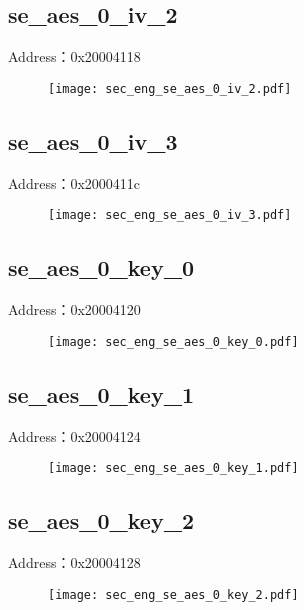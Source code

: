 \subsection{se\_aes\_0\_iv\_2}
\label{sec_eng-se-aes-0-iv-2}
Address：0x20004118
 \begin{figure}[H]
\texttt{[image: sec\_eng\_se\_aes\_0\_iv\_2.pdf]}
\end{figure}

\subsection{se\_aes\_0\_iv\_3}
\label{sec_eng-se-aes-0-iv-3}
Address：0x2000411c
 \begin{figure}[H]
\texttt{[image: sec\_eng\_se\_aes\_0\_iv\_3.pdf]}
\end{figure}

\subsection{se\_aes\_0\_key\_0}
\label{sec_eng-se-aes-0-key-0}
Address：0x20004120
 \begin{figure}[H]
\texttt{[image: sec\_eng\_se\_aes\_0\_key\_0.pdf]}
\end{figure}

\subsection{se\_aes\_0\_key\_1}
\label{sec_eng-se-aes-0-key-1}
Address：0x20004124
 \begin{figure}[H]
\texttt{[image: sec\_eng\_se\_aes\_0\_key\_1.pdf]}
\end{figure}

\subsection{se\_aes\_0\_key\_2}
\label{sec_eng-se-aes-0-key-2}
Address：0x20004128
 \begin{figure}[H]
\texttt{[image: sec\_eng\_se\_aes\_0\_key\_2.pdf]}
\end{figure}

